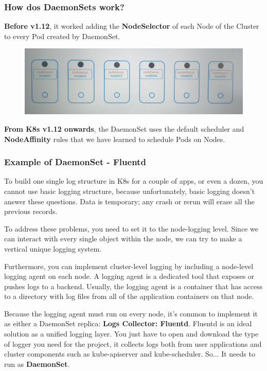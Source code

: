 \documentclass{article}
\begin{document}
\subsubsection{How dos DaemonSets work?}

\textbf{Before v1.12}, it worked adding the \textbf{NodeSelector} of each Node of the Cluster to every Pod created by DaemonSet. 

\begin{figure}[H]
    \includegraphics[width=\textwidth]{pictures/ds1.png}
\end{figure}


\textbf{From K8s v1.12 onwards}, the DaemonSet uses the default scheduler and \textbf{NodeAffinity} rules that we have learned to schedule Pods on Nodes.

\subsubsection{Example of DaemonSet - Fluentd}
To build one single log structure in K8s for a couple of apps, or even a dozen, you cannot use basic logging structure, because unfortunately, basic logging doesn’t answer these questions. Data is temporary; any crash or rerun will erase all the previous records.

To address these problems, you need to set it to the node-logging level. Since we can interact with every single object within the node, we can try to make a vertical unique logging system. 

Furthermore, you can implement cluster-level logging by including a node-level logging agent on each node. A logging agent is a dedicated tool that exposes or pushes logs to a backend. Usually, the logging agent is a container that has access to a directory with log files from all of the application containers on that node.

Because the logging agent must run on every node, it’s common to implement it as either a DaemonSet replica: \textbf{Logs Collector: Fluentd}. Fluentd is an ideal solution as a unified logging layer. You just have to open and download the type of logger you need for the project, 
it collects logs both from user applications and cluster components such as kube-apiserver and kube-scheduler. So... It needs to run as \textbf{DaemonSet}.
\end{document}

